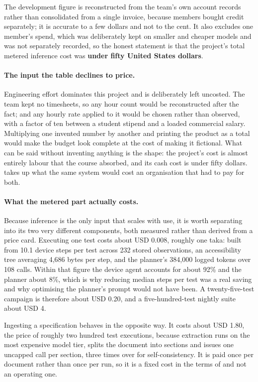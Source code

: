 The development figure is reconstructed from the team's own account records
rather than consolidated from a single invoice, because members bought credit
separately; it is accurate to a few dollars and not to the cent. It also
excludes one member's spend, which was deliberately kept on smaller and cheaper
models and was not separately recorded, so the honest statement is that the
project's total metered inference cost was \textbf{under fifty United States
dollars}.

\paragraph{The input the table declines to price.} Engineering effort dominates
this project and is deliberately left uncosted. The team kept no timesheets, so
any hour count would be reconstructed after the fact; and any hourly rate
applied to it would be chosen rather than observed, with a factor of ten
between a student stipend and a loaded commercial salary. Multiplying one
invented number by another and printing the product as a total would make the
budget look complete at the cost of making it fictional. What can be said
without inventing anything is the shape: the project's cost is almost entirely
labour that the course absorbed, and its cash cost is under fifty dollars.
 takes up what the same system would cost an organisation
that had to pay for both.

\paragraph{What the metered part actually costs.} Because inference is the only
input that scales with use, it is worth separating into its two very different
components, both measured rather than derived from a price card. Executing one
test costs about USD 0.008, roughly one taka: built from 10.1 device steps per
test across 232 stored observations, an accessibility tree averaging 4,686
bytes per step, and the planner's 384{,}000 logged tokens over 108 calls. Within
that figure the device agent accounts for about 92\% and the planner about 8\%,
which is why reducing median steps per test was a real saving and why
optimising the planner's prompt would not have been. A twenty-five-test
campaign is therefore about USD 0.20, and a five-hundred-test nightly suite
about USD 4.

Ingesting a specification behaves in the opposite way. It costs about USD 1.80,
the price of roughly two hundred test executions, because extraction
runs on the most expensive model tier, splits the document into sections and
issues one uncapped call per section, three times over for self-consistency. It
is paid once per document rather than once per run, so it is a fixed cost in
the terms of  and not an operating one.

